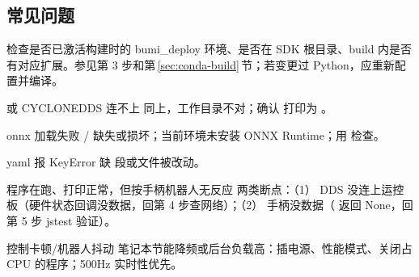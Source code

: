 \subsection*{常见问题}
\begin{faq}{}
检查是否已激活构建时的 bumi\_deploy 环境、是否在 SDK 根目录、build 内是否有对应扩展。参见第 3 步和第\,\ref{sec:conda-build}\,节；若变更过 Python，应重新配置并编译。
\end{faq}
\begin{faq}{ 或 CYCLONEDDS 连不上}
同上，工作目录不对；确认  打印为 。
\end{faq}
\begin{faq}{onnx 加载失败 / }
 缺失或损坏；当前环境未安装 ONNX Runtime；用  检查。
\end{faq}
\begin{faq}{yaml 报 KeyError }
 缺  段或文件被改动。
\end{faq}
\begin{faq}{程序在跑、打印正常，但按手柄机器人无反应}
两类断点：（1） DDS 没连上运控板（硬件状态回调没数据，回第 4 步查网络）；（2） 手柄没数据（ 返回 None，回第 5 步 jstest 验证）。
\end{faq}
\begin{faq}{控制卡顿/机器人抖动}
笔记本节能降频或后台负载高：插电源、性能模式、关闭占 CPU 的程序；500Hz 实时性优先。
\end{faq}
